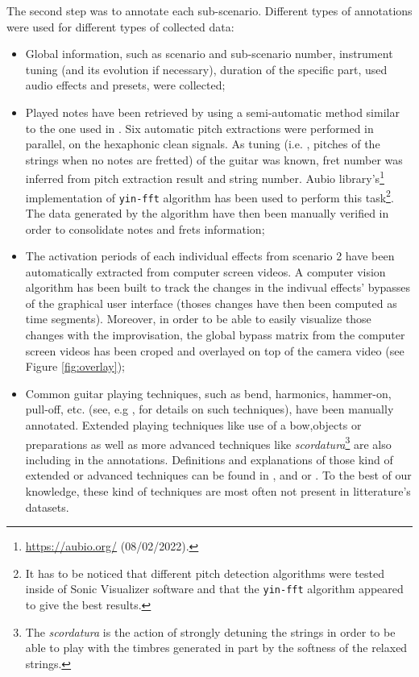 \documentclass{article}
\begin{document}
The second step was to annotate each sub-scenario. Different types of annotations were used for different types of collected data: 
\begin{itemize}
\item Global information, such as scenario and sub-scenario number, instrument tuning (and its evolution if necessary), duration of the specific part, used audio effects and presets, were collected;

\item Played notes have been retrieved by using a semi-automatic method similar to the one used in \cite{sci:Xi2018}. Six automatic pitch extractions were performed in parallel, on the hexaphonic clean signals. As tuning (i.e. , pitches of the strings when no notes are fretted) of the guitar was known, fret number was inferred from pitch extraction result and string number.  Aubio library's\footnote{\url{https://aubio.org/} (08/02/2022).} implementation of \texttt{yin-fft} algorithm \cite{sci:Brossier_yinFFT} has been used to perform this task\footnote{It has to be noticed that different pitch detection algorithms were tested inside of Sonic Visualizer software and that the \texttt{yin-fft} algorithm appeared to give the best results. }. The data generated by the algorithm have then been manually verified in order to consolidate notes and frets information; 

\item The activation periods of each individual effects from scenario 2 have been automatically extracted from computer screen videos. A computer vision algorithm has been built to track the changes in the indivual effects' bypasses of the graphical user interface (thoses changes have then been computed as time segments). Moreover, in order to be able to easily visualize those changes with the improvisation, the global bypass matrix from the computer screen videos has been croped and overlayed on top of the camera video (see Figure \ref{fig:overlay});

\item Common guitar playing techniques, such as bend, harmonics, hammer-on, pull-off, etc. (see, e.g \cite{sci:Su2014a}, for details on such techniques), have been manually annotated. Extended playing techniques like use of a bow,objects or preparations as well as more advanced techniques like \textit{scordatura}\footnote{The \textit{scordatura} is the action of strongly detuning the strings in order to be able to play with
the timbres generated in part by the softness of the relaxed strings.} are also including in the annotations. Definitions and explanations of those kind of extended or advanced techniques can be found in \cite{Josel2014},  \cite{organo:schndeider2015_microtones} and \cite{organo:Landman2012} or \cite{organo:ElgartYates1990}. To the best of our knowledge, these kind of techniques are most often not present in litterature's datasets.
\end{itemize}
\end{document}
